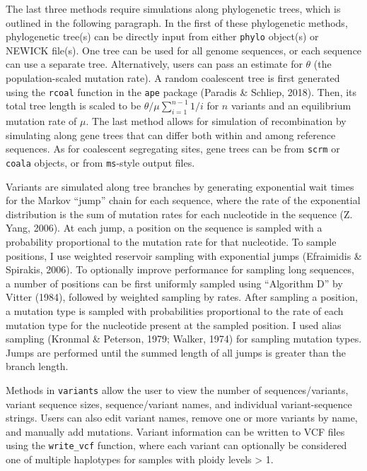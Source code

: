 \documentclass[12pt,]{article}
\begin{document}
The last three methods require simulations along phylogenetic trees,
which is outlined in the following paragraph. In the first of these
phylogenetic methods, phylogenetic tree(s) can be directly input from
either \texttt{phylo} object(s) or NEWICK file(s). One tree can be used
for all genome sequences, or each sequence can use a separate tree.
Alternatively, users can pass an estimate for \(\theta\) (the
population-scaled mutation rate). A random coalescent tree is first
generated using the \texttt{rcoal} function in the \texttt{ape} package
(Paradis \& Schliep, 2018). Then, its total tree length is scaled to be
\(\theta / \mu \sum_{i=1}^{n-1}{1 / i}\) for \(n\) variants and an
equilibrium mutation rate of \(\mu\). The last method allows for
simulation of recombination by simulating along gene trees that can
differ both within and among reference sequences. As for coalescent
segregating sites, gene trees can be from \texttt{scrm} or
\texttt{coala} objects, or from \texttt{ms}-style output files.

Variants are simulated along tree branches by generating exponential
wait times for the Markov ``jump'' chain for each sequence, where the
rate of the exponential distribution is the sum of mutation rates for
each nucleotide in the sequence (Z. Yang, 2006). At each jump, a
position on the sequence is sampled with a probability proportional to
the mutation rate for that nucleotide. To sample positions, I use
weighted reservoir sampling with exponential jumps (Efraimidis \&
Spirakis, 2006). To optionally improve performance for sampling long
sequences, a number of positions can be first uniformly sampled using
``Algorithm D'' by Vitter (1984), followed by weighted sampling by
rates. After sampling a position, a mutation type is sampled with
probabilities proportional to the rate of each mutation type for the
nucleotide present at the sampled position. I used alias sampling
(Kronmal \& Peterson, 1979; Walker, 1974) for sampling mutation types.
Jumps are performed until the summed length of all jumps is greater than
the branch length.

Methods in \texttt{variants} allow the user to view the number of
sequences/variants, variant sequence sizes, sequence/variant names, and
individual variant-sequence strings. Users can also edit variant names,
remove one or more variants by name, and manually add mutations. Variant
information can be written to VCF files using the \texttt{write\_vcf}
function, where each variant can optionally be considered one of
multiple haplotypes for samples with ploidy levels \textgreater{} 1.
\end{document}
